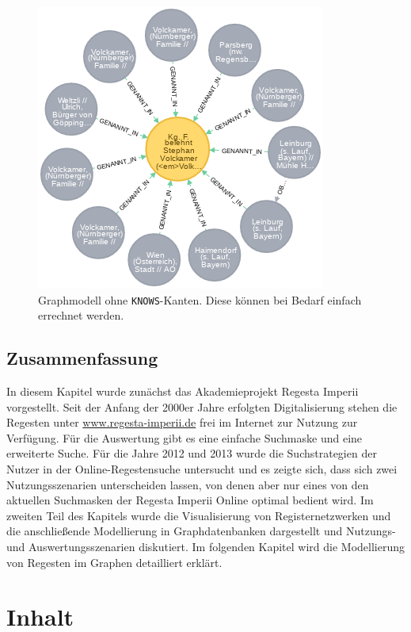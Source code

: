 \documentclass[ngerman,]{scrreprt}
\begin{document}
\begin{figure}
\centering
\includegraphics{Bilder/1zu1-Beziehungen-nur-Regest.png}
\caption{Graphmodell ohne \texttt{KNOWS}-Kanten. Diese können bei Bedarf einfach errechnet werden.}
\end{figure}

\section{Zusammenfassung}\label{zusammenfassung}

In diesem Kapitel wurde zunächst das Akademieprojekt Regesta Imperii vorgestellt. Seit der Anfang der 2000er Jahre erfolgten Digitalisierung stehen die Regesten unter \url{www.regesta-imperii.de} frei im Internet zur Nutzung zur Verfügung. Für die Auswertung gibt es eine einfache Suchmaske und eine erweiterte Suche. Für die Jahre 2012 und 2013 wurde die Suchstrategien der Nutzer in der Online-Regestensuche untersucht und es zeigte sich, dass sich zwei Nutzungsszenarien unterscheiden lassen, von denen aber nur eines von den aktuellen Suchmasken der Regesta Imperii Online optimal bedient wird. Im zweiten Teil des Kapitels wurde die Visualisierung von Registernetzwerken und die anschließende Modellierung in Graphdatenbanken dargestellt und Nutzungs- und Auswertungsszenarien diskutiert. Im folgenden Kapitel wird die Modellierung von Regesten im Graphen detailliert erklärt.

\chapter{Inhalt}\label{inhalt-2}
\end{document}
